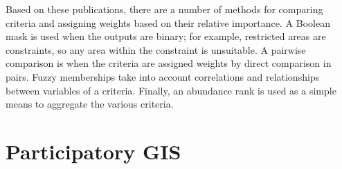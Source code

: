 Based on these publications, there are a number of methods for comparing criteria and assigning weights based on their relative importance. A Boolean mask is used when the outputs are binary; for example, restricted areas are constraints, so any area within the constraint is unsuitable. A pairwise comparison is when the criteria are assigned weights by direct comparison in pairs. Fuzzy memberships take into account correlations and relationships between variables of a criteria. Finally, an abundance rank is used as a simple means to aggregate the various criteria.

\section{Participatory GIS}
